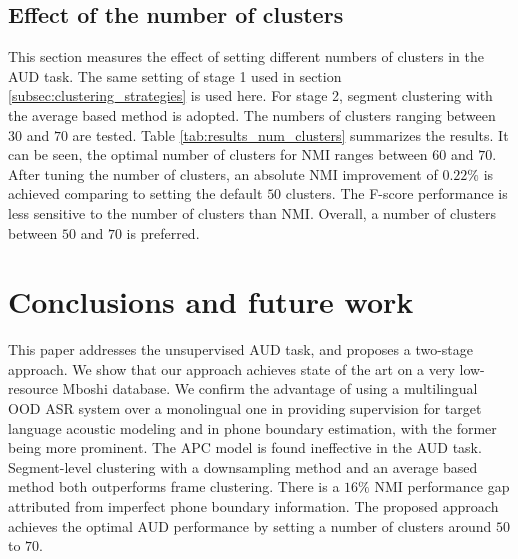 \documentclass[a4paper]{article}
\begin{document}
\subsection{Effect of the number of clusters}
\label{subsec:number_of_clusters}
\begin{table}[!t]
\renewcommand\arraystretch{0.7}
\centering
\caption{NMI (row 2) and F-score (row 3) performances w.r.t different numbers of clusters (row 1).}
\label{tab:results_num_clusters}
\end{table}
This section measures the effect of setting different numbers of clusters in the AUD task. The same setting of stage 1 used in section \ref{subsec:clustering_strategies} is used here. For stage 2, segment clustering with the average based method is adopted. The numbers of clusters ranging between $30$ and $70$ are tested. Table \ref{tab:results_num_clusters} summarizes the results. It can be seen, 
the optimal number of clusters for NMI ranges between $60$ and $70$. After tuning the number of clusters, an absolute NMI improvement of $0.22\%$ is achieved comparing to setting the default $50$ clusters. 
The F-score performance is less sensitive to the number of clusters than NMI. 
Overall, a number of clusters between $50$ and $70$ is preferred.



\section{Conclusions and future work}
\label{sec:conclu}
This paper addresses the unsupervised AUD task, and proposes a two-stage approach. We show that our approach achieves state of the art on a very low-resource Mboshi database. We confirm the advantage of using a multilingual OOD ASR system over a monolingual one in providing supervision for target language acoustic modeling and in phone boundary estimation, with the former being more prominent. The APC model is found ineffective in the AUD task. Segment-level clustering with   a downsampling method and an average based method both outperforms frame clustering. There is a $16\%$ NMI performance gap attributed from imperfect phone boundary information. The proposed approach achieves the optimal AUD performance by setting a number of clusters around $50$ to $70$.
\end{document}
